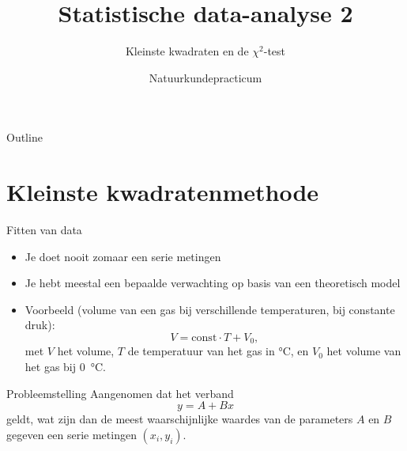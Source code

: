 \documentclass{beamer}
\title{Statistische data-analyse 2}
\subtitle{Kleinste kwadraten en de $\chi^2$-test}
\author{Natuurkundepracticum}
\institute{
  Vrije Universiteit / Universiteit van Amsterdam
}
\date{}
\begin{document}
\begin{frame}
  \titlepage
\end{frame}

\begin{frame}{Outline}
  \tableofcontents
\end{frame}




\section{Kleinste kwadratenmethode}

\begin{frame}{Fitten van data}
  \begin{itemize}
    \item Je doet nooit zomaar een serie metingen
    \item Je hebt meestal een bepaalde verwachting op basis van een theoretisch model
    \pause
    \item Voorbeeld (volume van een gas bij verschillende temperaturen, bij constante druk):
    \begin{equation*}
      V = \mathrm{const}\cdot T + V_0,
    \end{equation*}
    met $V$ het volume, $T$ de temperatuur van het gas in \si{\celsius}, en $V_0$ het volume van het gas bij \SI{0}{\celsius}.
  \end{itemize}
\end{frame}

\begin{frame}{Probleemstelling}
  Aangenomen dat het verband
  \begin{equation*}
    y = A + Bx
  \end{equation*}
  geldt, wat zijn dan de meest waarschijnlijke waardes van de parameters $A$ en $B$ gegeven een serie metingen $(x_i, y_i)$.
\end{frame}
\end{document}
